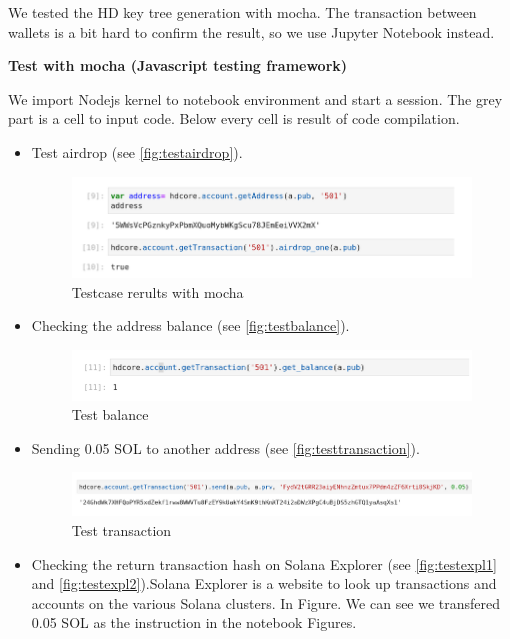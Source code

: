 We tested the HD key tree generation with mocha. The transaction between wallets is a bit hard to confirm the result, so we use Jupyter Notebook instead.

\bigskip
{\textbf{Test with mocha (Javascript testing framework)}}
\bigskip

We import Nodejs kernel to notebook environment and start a session. The grey part is a cell to input code. Below every cell is result of code compilation.

\begin{itemize}
    \item Test airdrop (see \autoref{fig:testairdrop}).
    \begin{figure}[ht!]
        \centering
        \includegraphics[width=1\textwidth]{images/testairdrop.png}
        \caption[Testcase rerults with mocha]{Testcase rerults with mocha}
        \label{fig:testairdrop}
    \end{figure}
    \item Checking the address balance (see \autoref{fig:testbalance}).
    \begin{figure}[ht!]
        \centering
        \includegraphics[width=1\textwidth]{images/testgetbalance.png}
        \caption[Test balance]{Test balance}
        \label{fig:testbalance}
    \end{figure}
    \item Sending 0.05 SOL to another address (see \autoref{fig:testtransaction}).
    \begin{figure}[ht!]
        \centering
        \includegraphics[width=1\textwidth]{images/testtransaction.png}
        \caption[Test transaction]{Test transaction}
        \label{fig:testtransaction}
    \end{figure}
    \item Checking the return transaction hash on Solana Explorer (see \autoref{fig:testexpl1} and \autoref{fig:testexpl2}).Solana Explorer is a website to look up transactions and accounts on the various Solana clusters. In Figure. We can see we transfered 0.05 SOL as the instruction in the notebook Figures.


\end{itemize}
